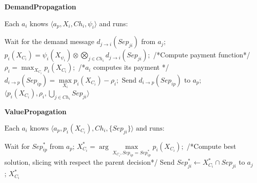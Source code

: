 \documentclass{aamas2012}
\begin{document}
\begin{algorithm}[!tb]
\caption{\textbf{DemandPropagation}} 
\small Each $a_i$ knows $\langle a_p, X_i,
Ch_i,\psi_i\rangle$ and runs:\normalsize
\small
 \begin{algorithmic}[1] 
        \STATE Wait for the demand message $d_{j \rightarrow i}(Sep_{ji})$ from
        $a_j$;
    \ENDFOR
     \STATE $p_i(X_{C_i}) =  \psi_i(X_{\psi_i}) \otimes \bigotimes_{j \in Ch_i}
     d_{j \rightarrow i}(Sep_{ji});$ /*Compute payment function*/
     \STATE $\rho_i = \max_{X_{C_i}} p_i(X_{C_i});$
     /*$a_i$ computes its payment */
    	\STATE $d_{i \rightarrow p}(Sep_{ip})= \max\limits_{X_i}
    	p_i(X_{C_i}) - \rho_i ;$ 
    	 \STATE Send $d_{i\rightarrow p}(Sep_{ip})$ to $a_p$;
    \ENDIF 
    \RETURN $\langle p_i(X_{C_i}),\rho_i,\bigcup_{j\in Ch_i}Sep_{ji} \rangle$
\end{algorithmic}
\label{proc:demandpropagation}
\vspace{-0.03in}
\end{algorithm}

\begin{algorithm}[!tb]
\caption{\textbf{ValuePropagation}} 
\small $\text{Each } a_i \text{ knows } \langle
a_p,p_i(X_{C_i}),Ch_i,\{Sep_{ji}\}\rangle\text{ and runs:}$
\small
\begin{algorithmic}[1]
  		\STATE  Wait for $Sep^*_{ip}$ from $a_p$;
    \ENDIF
     \STATE $X^*_{C_i} = \arg \max\limits_{X_{C_i}, Sep_{ip} = Sep^*_{ip} }
  	     p_i(X_{C_i});$ /*Compute best solution, slicing with respect the
  	     parent decision*/
        \STATE Send $Sep^*_{ji}\leftarrow X^*_{C_i}\cap Sep_{ji}$ to $a_j$;
    \ENDFOR
    \RETURN $X^*_{C_i}$
\end{algorithmic}
\label{proc:valuepropagation}
\vspace{-0.03in}
\end{algorithm}


\end{document}
